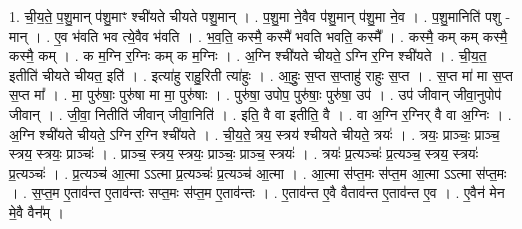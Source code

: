 \documentclass[17pt]{extarticle}
\begin{document}
1. ची॒य॒ते॒ प॒शु॒मान् प॑शु॒माꣳ श्ची॑यते चीयते पशु॒मान् । . प॒शु॒मा ने॒वैव प॑शु॒मान् प॑शु॒मा ने॒व । . प॒शु॒मानिति॑ पशु - मान् । . ए॒व भ॑वति भव त्ये॒वैव भ॑वति । . भ॒व॒ति॒ कस्मै॒ कस्मै॑ भवति भवति॒ कस्मै᳚ । . कस्मै॒ कम् कम् कस्मै॒ कस्मै॒ कम् । . क म॒ग्नि र॒ग्निः कम् क म॒ग्निः । . अ॒ग्नि श्ची॑यते चीयते॒ ऽग्नि र॒ग्नि श्ची॑यते । . ची॒य॒त॒ इतीति॑ चीयते चीयत॒ इति॑ । . इत्या॑हु राहु॒रिती त्या॑हुः । . आ॒हुः॒ स॒प्त स॒प्ताहु॑ राहुः स॒प्त । . स॒प्त मा॑ मा स॒प्त स॒प्त मा᳚ । . मा॒ पुरु॑षाः॒ पुरु॑षा मा मा॒ पुरु॑षाः । . पुरु॑षा॒ उपोप॒ पुरु॑षाः॒ पुरु॑षा॒ उप॑ । . उप॑ जीवान् जीवा॒नुपोप॑ जीवान् । . जी॒वा॒ नितीति॑ जीवान् जीवा॒निति॑ । . इति॒ वै वा इतीति॒ वै । . वा अ॒ग्नि र॒ग्निर् वै वा अ॒ग्निः । . अ॒ग्नि श्ची॑यते चीयते॒ ऽग्नि र॒ग्नि श्ची॑यते । . ची॒य॒ते॒ त्रय॒ स्त्रय॑ श्चीयते चीयते॒ त्रयः॑ । . त्रयः॒ प्राञ्चः॒ प्राञ्च॒ स्त्रय॒ स्त्रयः॒ प्राञ्चः॑ । . प्राञ्च॒ स्त्रय॒ स्त्रयः॒ प्राञ्चः॒ प्राञ्च॒ स्त्रयः॑ । . त्रयः॑ प्र॒त्यञ्चः॑ प्र॒त्यञ्च॒ स्त्रय॒ स्त्रयः॑ प्र॒त्यञ्चः॑ । . प्र॒त्यञ्च॑ आ॒त्मा ऽऽत्मा प्र॒त्यञ्चः॑ प्र॒त्यञ्च॑ आ॒त्मा । . आ॒त्मा स॑प्त॒मः स॑प्त॒म आ॒त्मा ऽऽत्मा स॑प्त॒मः । . स॒प्त॒म ए॒ताव॑न्त ए॒ताव॑न्तः सप्त॒मः स॑प्त॒म ए॒ताव॑न्तः । . ए॒ताव॑न्त ए॒वै वैताव॑न्त ए॒ताव॑न्त ए॒व । . ए॒वैन॑ मेन मे॒वै वैन᳚म् । \newline
\end{document}
